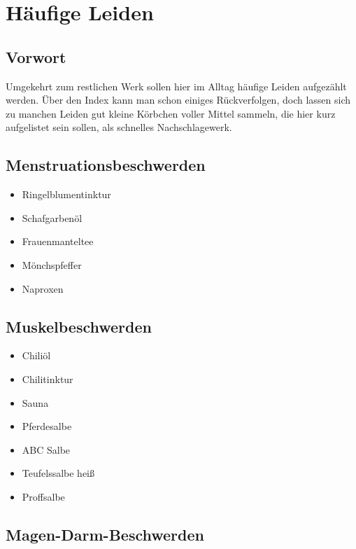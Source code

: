 \chapter{Häufige Leiden}

\section{Vorwort}

Umgekehrt zum restlichen Werk sollen hier im Alltag häufige Leiden aufgezählt werden. Über den Index kann man schon einiges Rückverfolgen, doch lassen sich zu manchen Leiden gut kleine Körbchen voller Mittel sammeln, die hier kurz aufgelistet sein sollen, als schnelles Nachschlagewerk.


\section{Menstruationsbeschwerden}


\begin{itemize}
	\item Ringelblumentinktur
	\item Schafgarbenöl
	\item Frauenmanteltee
	\item Mönchspfeffer
	\item Naproxen
\end{itemize}



\section{Muskelbeschwerden}
   


\begin{itemize}
	\item Chiliöl
	\item Chilitinktur
	\item Sauna
	\item Pferdesalbe
	\item ABC Salbe
	\item Teufelssalbe heiß
	\item Proffsalbe	
\end{itemize}


\section{Magen-Darm-Beschwerden}


